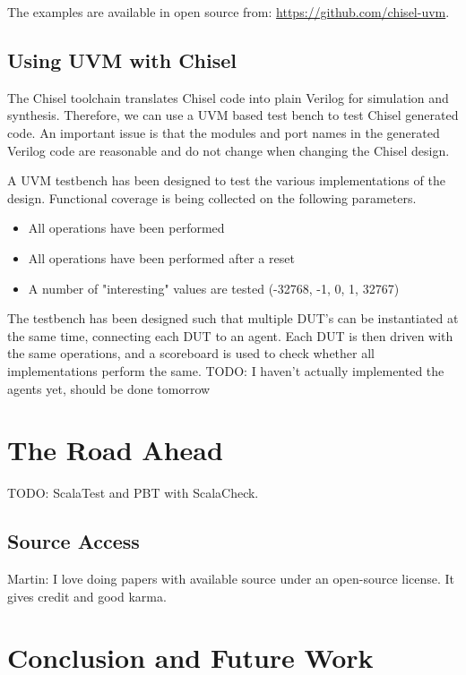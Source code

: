 \documentclass[a4paper, conference]{IEEEtran}
\newcommand{\todo}[1]{{\color{olive} TODO: #1}}
\newcommand{\martin}[1]{{\color{blue} Martin: #1}}
\begin{document}
The examples are available in open source from: \url{https://github.com/chisel-uvm}.

\subsection{Using UVM with Chisel}

The Chisel toolchain translates Chisel code into plain Verilog for simulation and
synthesis. Therefore, we can use a UVM based test bench to test Chisel generated code.
An important issue is that the modules and port names in the generated Verilog
code are reasonable and do not change when changing the Chisel design.

A UVM testbench has been designed to test the various implementations of the design. Functional coverage is being collected on the following parameters.
\begin{itemize}
    \item All operations have been performed
    \item All operations have been performed after a reset
    \item A number of "interesting" values are tested (-32768, -1, 0, 1, 32767)
\end{itemize}

The testbench has been designed such that multiple DUT's can be instantiated at the same time, connecting each DUT to an agent. Each DUT is then driven with the same operations, and a scoreboard is used to check whether all implementations perform the same.
\todo{I haven't actually implemented the agents yet, should be done tomorrow}

\section{The Road Ahead}

\todo{ScalaTest and PBT with ScalaCheck.}




\subsection{Source Access}

\martin{I love doing papers with available source under an
open-source license. It gives credit and good karma.}


\section{Conclusion and Future Work}
\label{sec:conclusion}
\end{document}
